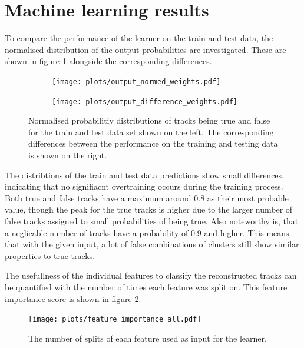 \section{Machine learning results}
To compare the performance of the learner on the train and test data, the normalised distribution of the output probabilities are investigated.
These are shown in figure \ref{fig:output} alongside the corresponding differences.

\begin{figure}
  \hspace{-2.5cm}
  \begin{subfigure}{0.62\textwidth}
      \centering
      \texttt{[image: plots/output\_normed\_weights.pdf]}
  \end{subfigure}
  \begin{subfigure}{0.62\textwidth}
      \hspace{0.95cm}
      \texttt{[image: plots/output\_difference\_weights.pdf]}
  \end{subfigure}
  \caption{Normalised probabilitiy distributions of tracks being true and false for the train and test data set shown on the left.
  The corresponding differences between the performance on the training and testing data is shown on the right.}
  \label{fig:output}
\end{figure}

The distribtions of the train and test data predictions show small differences, indicating that no signifiacnt overtraining occurs during the training process.
Both true and false tracks have a maximum around 0.8 as their most probable value, though the peak for the true tracks is higher due to the larger number
of false tracks assigned to small probabilities of being true. Also noteworthy is, that a neglicable number of tracks have a probability of 0.9 and higher. This means that
with the given input, a lot of false combinations of clusters still show similar properties to true tracks.

The usefullness of the individual features to classify the reconstructed tracks can be quantified with the number of times each feature was split on.
This feature importance score is shown in figure \ref{fig:importance}.

\begin{figure}
  \centering
  \texttt{[image: plots/feature\_importance\_all.pdf]}
  \caption{The number of splits of each feature used as input for the learner.}
  \label{fig:importance}
\end{figure}

